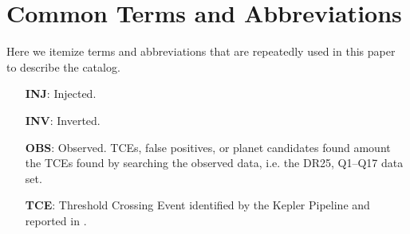 \section{Common Terms and Abbreviations}
\label{abbrev}
Here we itemize terms and abbreviations that are repeatedly used in this paper to describe the catalog.

\begin{itemize}
\itemp[ \textbf{KOI}: Kepler Object of Interest.
\item[] \textbf{INJ}: Injected.
\item[] \textbf{INV}: Inverted.
\item[] \textbf{OBS}: Observed. TCEs, false positives, or planet candidates found amount the TCEs found by searching the observed data, i.e. the DR25, Q1--Q17 data set.
\item[] \textbf{TCE}: Threshold Crossing Event identified by the Kepler Pipeline and reported in \citet{Twicken2016}.

\end{itemize}
